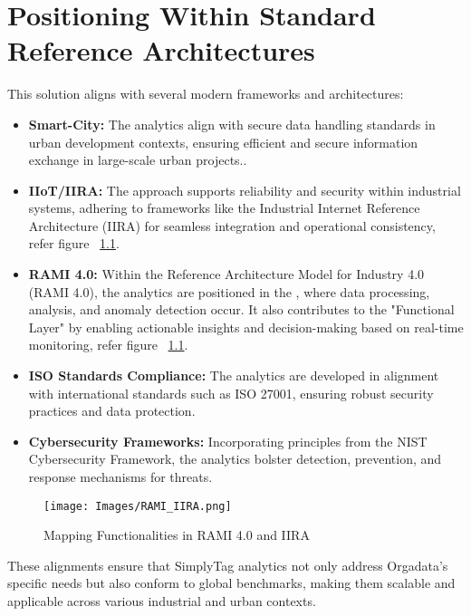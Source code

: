 %
%

\chapter{Positioning Within Standard Reference Architectures}

This solution aligns with several modern frameworks and architectures:

\begin{itemize}
	\item \textbf{Smart-City:} The analytics align with secure data handling standards in urban development contexts, ensuring efficient and secure information exchange in large-scale urban projects..
	\item \textbf{IIoT/IIRA:} The approach supports reliability and security within industrial systems, adhering to frameworks like the Industrial Internet Reference Architecture (IIRA) for seamless integration and operational consistency, refer figure ~\ref{RAMI_IIRA}.
	\item \textbf{RAMI 4.0:} Within the Reference Architecture Model for Industry 4.0 (RAMI 4.0), the analytics are positioned in the , where data processing, analysis, and anomaly detection occur. It also contributes to the "Functional Layer" by enabling actionable insights and decision-making based on real-time monitoring, refer figure ~\ref{RAMI_IIRA}.
	\item \textbf{ISO Standards Compliance:} The analytics are developed in alignment with international standards such as ISO 27001, ensuring robust security practices and data protection.
	\item \textbf{Cybersecurity Frameworks:} Incorporating principles from the NIST Cybersecurity Framework, the analytics bolster detection, prevention, and response mechanisms for threats.
\end{itemize}

\begin{figure}
	\begin{center}
		\texttt{[image: Images/RAMI\_IIRA.png]}
		\caption{Mapping Functionalities in RAMI 4.0 and IIRA}
		\label{RAMI_IIRA}
	\end{center}
\end{figure}
  
These alignments ensure that SimplyTag analytics not only address Orgadata’s specific needs but also conform to global benchmarks, making them scalable and applicable across various industrial and urban contexts.
  
   
  
   

 